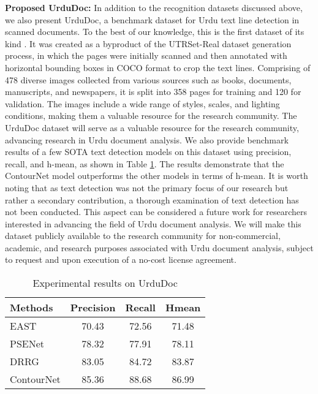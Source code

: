 \documentclass[runningheads]{llncs}
\newcommand{\DatasetNameReal}{{UTRSet-Real}\xspace}
\newcommand{\DetectionDataset}{{UrduDoc}\xspace}
\newcommand{\mypara}[1]{\vspace{0.5em} \noindent \textbf{#1:}}
\begin{document}
\mypara{Proposed \DetectionDataset}
In addition to the recognition datasets discussed above, we also present {\DetectionDataset}, a benchmark dataset for Urdu text line detection in scanned documents. To the best of our knowledge, this is the first dataset of its kind \cite{urdu_text_det,cursive_text_det}. It was created as a byproduct of the \DatasetNameReal dataset generation process, in which the pages were initially scanned and then annotated with horizontal bounding boxes in COCO format \cite{coco_orig} to crop the text lines. Comprising of 478 diverse images collected from various sources such as books, documents, manuscripts, and newspapers, it is split into 358 pages for training and 120 for validation. The images include a wide range of styles, scales, and lighting conditions, making them a valuable resource for the research community. The {\DetectionDataset} dataset will serve as a valuable resource for the research community, advancing research in Urdu document analysis. We also provide benchmark results of a few SOTA text detection models on this dataset using precision, recall, and h-mean, as shown in Table \ref{tab:detection-results}. The results demonstrate that the ContourNet model \cite{contournet_orig} outperforms the other models in terms of h-mean. It is worth noting that as text detection was not the primary focus of our research but rather a secondary contribution, a thorough examination of text detection has not been conducted. This aspect can be considered a future work for researchers interested in advancing the field of Urdu document analysis. We will make this dataset publicly available to the research community for non-commercial, academic, and research purposes associated with Urdu document analysis, subject to request and upon execution of a no-cost license agreement.

\begin{table}[b]
\centering
\setlength{\tabcolsep}{20pt}
\begin{tabular}{lccc}
	\toprule[1.5pt]
	\textbf{Methods} & \textbf{Precision} & \textbf{Recall} & \textbf{Hmean}\\ [0.5ex]
	\midrule[0.5pt]
	EAST \cite{east_orig} & 70.43 & 72.56 & 71.48 \\
	PSENet \cite{psenet_orign} & 78.32 & 77.91 & 78.11 \\
	DRRG \cite{drrg_orig} & 83.05 & 84.72 & 83.87 \\
	ContourNet \cite{contournet_orig} & 85.36 & 88.68 & 86.99 \\
	\bottomrule[1.5pt] 
\end{tabular}
\vspace{1em}
\caption{Experimental results on {\DetectionDataset}}
\label{tab:detection-results}
\vspace{-2em}
\end{table}
\end{document}
